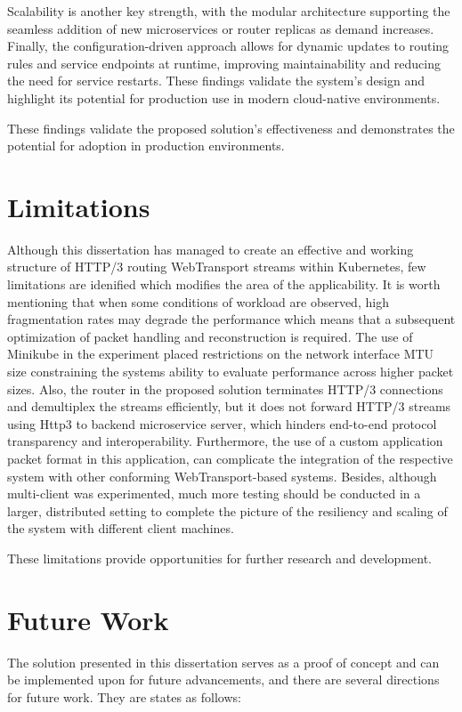 Scalability is another key strength, with the modular architecture supporting the seamless addition of new microservices or router replicas as demand increases. Finally, the configuration-driven approach allows for dynamic updates to routing rules and service endpoints at runtime, improving maintainability and reducing the need for service restarts. These findings validate the system’s design and highlight its potential for production use in modern cloud-native environments.

These findings validate the proposed solution's effectiveness and demonstrates the potential for adoption in production environments.

\section{Limitations}

Although this dissertation has managed to create an effective and working structure of HTTP/3 routing WebTransport streams within Kubernetes, few limitations are idenified which modifies the area of the applicability. It is worth mentioning that when some conditions of workload are observed, high fragmentation rates may degrade the performance which means that a subsequent optimization of packet handling and reconstruction is required. The use of Minikube in the experiment placed restrictions on the network interface MTU size constraining the systems ability to evaluate performance across higher packet sizes. Also, the router in the proposed solution terminates HTTP/3 connections and demultiplex the streams efficiently, but it does not forward HTTP/3 streams using Http3 to backend microservice server, which hinders end-to-end protocol transparency and interoperability. Furthermore, the use of a custom application packet format in this application, can complicate the integration of the respective system with other conforming WebTransport-based systems. Besides, although multi-client was experimented, much more testing should be conducted in a larger, distributed setting to complete the picture of the resiliency and scaling of the system with different client machines.

These limitations provide opportunities for further research and development.

\section{Future Work}

The solution presented in this dissertation serves as a proof of concept and can be implemented upon for future advancements, and there are several directions for future work. They are states as follows:

